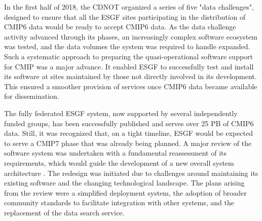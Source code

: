 \documentclass[manuscript]{copernicus}
\newcommand{\mycomment}[1]{}
\def\cred#1{{\color{red}#1}}
\begin{document}
In the first half of 2018, the CDNOT organized a series of five "data challenges", designed to ensure that all the ESGF sites participating in the distribution of CMIP6 data would be ready to accept CMIP6 data. As the data challenge activity advanced through its phases, an increasingly complex software ecosystem was tested, and the data volumes the system was required to handle expanded. Such a systematic approach to preparing the quasi-operational software support for CMIP was a major advance. It enabled ESGF to successfully test and install its software at sites maintained by those not directly involved in its development. This ensured a smoother provision of services once CMIP6 data became available for dissemination.

The fully federated ESGF system, now supported by several independently funded groups, has been successfully published and serves over 25 PB of CMIP6 data. Still, it was recognized that, on a tight timeline, ESGF would be expected to serve a CMIP7 phase that was already being planned. A major review of the software system was undertaken with a fundamental reassessment of its requirements, which would guide the development of a new overall system architecture \citep{kershaw_esgf_2020}. The redesign was initiated due to challenges around maintaining its existing software and the changing technological landscape. The plans arising from the review were a simplified deployment system, the adoption of broader community standards to facilitate integration with other systems, and the replacement of the data search service.


\mycomment{
CMIP6 current nodes - https://aims2.llnl.gov/nodes - 30
Very early CMIP5 http://web.archive.org/web/20111015000202/http://pcmdi3.llnl.gov/esgcet/home.htm 7 nodes ESG-CET + BADC, WDCC, NCI
ESG-CET NCAR, LLNL, ORNL https://extranet.gfdl.noaa.gov/~vb/curator/AR5-20071017/ESG-CET200710.pdf Oct 2007
2013 Aspen workshop - https://www.wcrp-climate.org/images/modelling/WGCM/WGCM17/WGCM17_report.pdf;
Middleton, Foster, and Williams et al., 2006: Earth System Grid II final report 2001-2006 SCIDAC https://www.osti.gov/servlets/purl/1113798 https://doi.org/10.2172/1113798
}
\end{document}
